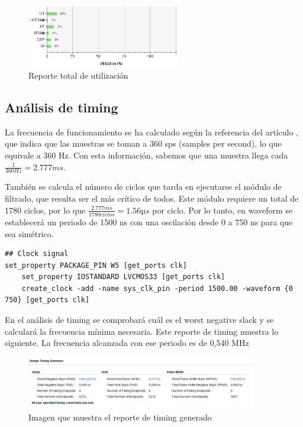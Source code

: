 \begin{figure}[h]
	\centering
	\includegraphics[width=0.6\textwidth]{./Images/img_res_experimentales/utilization3.png}
	\caption{Reporte total de utilización}
	\label{fig:utilization3}
\end{figure}


\subsection{Análisis de timing}

La frecuencia de funcionamiento se ha calculado según la referencia del artículo \cite{desai2021low}, que indica que las muestras se toman a 360 sps (samples per second), lo que equivale a 360 Hz. Con esta información, sabemos que una muestra llega cada \( \frac{1}{360 Hz} = 2.777 ms\).

También se calcula el número de ciclos que tarda en ejecutarse el módulo de filtrado, que resulta ser el más crítico de todos. Este módulo requiere un total de 1780 ciclos, por lo que \( \frac{2.777  ms}{1780 ciclos} = 1.56  µs \) por ciclo. Por lo tanto, en waveform se establecerá un periodo de 1500 ns con una oscilación desde 0 a 750 ns para que sea simétrico.


\lstset{language=VHDL, breaklines=true, basicstyle=\footnotesize}
\begin{lstlisting}[frame=single]
## Clock signal
set_property PACKAGE_PIN W5 [get_ports clk]							
	set_property IOSTANDARD LVCMOS33 [get_ports clk]
	create_clock -add -name sys_clk_pin -period 1500.00 -waveform {0 750} [get_ports clk]
\end{lstlisting}

	En el análisis de timing se comprobará cuál es el worst negative slack y se calculará la frecuencia mínima necesaria. Este reporte de timing muestra lo siguiente. La frecuencia alcanzada con ese periodo es de 0,540 MHz

	\begin{figure}[h!]
		\centering
		\includegraphics[width=0.9\textwidth]{./Images/img_res_experimentales/reportetiming.png}
		\caption{Imagen que muestra el reporte de timing generado}
		\label{fig:reporteTiming}
	\end{figure} 

